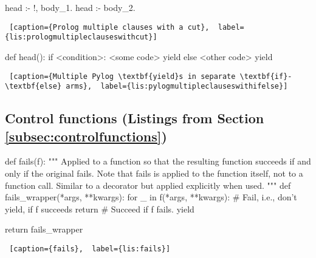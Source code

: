\noindent
\begin{minipage}{\linewidth}  \largev   
\begin{python}
head :- !, body_1.
head :- body_2.
\end{python}
\begin{lstlisting} [caption={Prolog multiple clauses with a cut},  label={lis:prologmultipleclauseswithcut}]
\end{lstlisting}
\end{minipage}

\noindent
\begin{minipage}{\linewidth}  \largev   
\begin{python}
def head():
    if <condition>:
      <some code>
      yield
    else
      <other code>
      yield
\end{python}
\begin{lstlisting} [caption={Multiple Pylog \textbf{yield}s in separate \textbf{if}-\textbf{else} arms},  label={lis:pylogmultipleclauseswithifelse}]
\end{lstlisting}
\end{minipage}

\subsection{Control functions (Listings from Section \ref{subsec:controlfunctions})} \label{appsubsec:controlfunctions}

\begin{minipage}{\linewidth}  \largev 
\begin{python}[numbers=left]
def fails(f):
  """
  Applied to a function so that the resulting function succeeds if and only if the original fails.
  Note that fails is applied to the function itself, not to a function call.
  Similar to a decorator but applied explicitly when used.
  """
  def fails_wrapper(*args, **kwargs):
    for _ in f(*args, **kwargs):
      # Fail, i.e., don't yield, if f succeeds
      return  
    # Succeed if f fails.
    yield     

  return fails_wrapper
\end{python}
\begin{lstlisting} [caption={fails},  label={lis:fails}]
\end{lstlisting}
\end{minipage}

